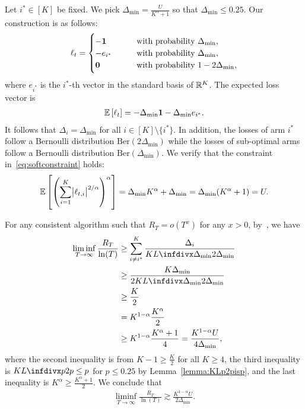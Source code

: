 Let $i^* \in [K]$ be fixed. We pick $\Delta_{\min} = \frac{U}{K^\alpha + 1}$ so that $\Delta_{\min} \leq 0.25$.
Our construction is as follows:
\begin{align*}
    \ell_t = \begin{cases}
        -\bm{1} &\qquad\text{with probability } \Delta_{\min},\\
        -e_{i^*} &\qquad\text{with probability } \Delta_{\min}, \\
        \mathbf{0} &\qquad\text{with probability } 1-2\Delta_{\min},
    \end{cases}
\end{align*}
where $e_{i^*}$ is the $i^*$-th vector in the standard basis of $\mathbb{R}^K$.
The expected loss vector is
\begin{align*}
    \mathbb{E}\left[ \ell_t\right] = -\Delta_{\min}\bm{1} - \Delta_{\min}e_{i^*}.
\end{align*}
It follows that $\Delta_i = \Delta_{\min}$ for all $i \in [K] \setminus \{i^*\}$. In addition, the losses of arm $i^*$ follow a Bernoulli distribution $\mathrm{Ber}(2\Delta_{\min})$ while the losses of sub-optimal arms follow a Bernoulli distribution $\mathrm{Ber}(\Delta_{\min})$.
We verify that the constraint in~\eqref{eq:softconstraint} holds:
\begin{align*}
    \mathbb{E}\left[\left(\sum_{i=1}^K \abs{\ell_{t,i}}^{2/\alpha}\right)^\alpha \right] = \Delta_{\min} K^\alpha + \Delta_{\min} = \Delta_{\min}(K^\alpha + 1) = U.
\end{align*}

For any consistent algorithm such that $R_T = o(T^x)$ for any $x > 0$, by~\cite{LaiAndRobbins1985}, we have
\begin{align*}
    \liminf_{T \to \infty} \frac{R_T}{\ln(T)} &\geq \sum_{i \neq i^*}^K \frac{\Delta_i}{\infdiv{\Delta_{\min}}{2\Delta_{\min}}} \\
    &\geq \frac{K \Delta_{\min}}{2\infdiv{\Delta_{\min}}{2\Delta_{\min}}} \\
    &\geq \frac{K}{2} \\
    &= K^{1-\alpha}\frac{K^\alpha}{2} \\
    &\geq K^{1-\alpha}\frac{K^\alpha + 1}{4} = \frac{K^{1-\alpha}U}{4\Delta_{\min}},
\end{align*}
where the second inequality is from $K-1 \geq \frac{K}{2}$ for all $K \geq 4$, the third inequality is $\infdiv{p}{2p} \leq p$  for $p \leq 0.25$ by Lemma~\ref{lemma:KLp2pisp}, and the last inequality is $K^\alpha \geq \frac{K^\alpha + 1}{2}$. We conclude that 
\begin{align*}
    \liminf_{T \to \infty}\frac{R_T}{\ln(T)} \gtrsim \frac{K^{1-\alpha}U}{2\Delta_{\min}}.
\end{align*}

